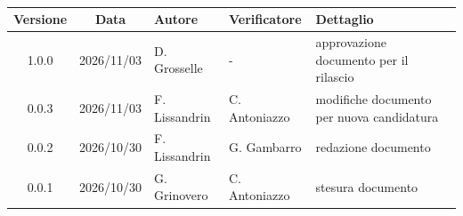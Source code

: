\\[0.5cm]

\renewcommand{\arraystretch}{1.3}
\noindent\begin{tabularx}{\textwidth}{|c|c|>{\raggedright\arraybackslash}p{2.8cm}|>{\raggedright\arraybackslash}p{2.8cm}|X|}
    \hline
    \textbf{Versione} & \textbf{Data} & \textbf{Autore} & \textbf{Verificatore} & \textbf{Dettaglio} \\
    \hline
    1.0.0 & 2026/11/03 & D. Grosselle & - & approvazione documento per il rilascio \\
    \hline
    0.0.3 & 2026/11/03 & F. Lissandrin & C. Antoniazzo & modifiche documento per nuova candidatura \\
    \hline
    0.0.2 & 2026/10/30 & F. Lissandrin & G. Gambarro & redazione documento \\
    \hline
    0.0.1 & 2026/10/30 & G. Grinovero & C. Antoniazzo & stesura documento \\
    \hline
\end{tabularx}
\newpage
